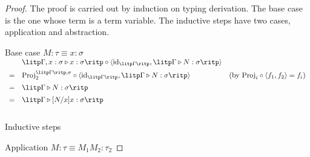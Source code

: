 \begin{proof}\mbox\\

The proof is carried out by induction on typing derivation. The base case is the one whose term is a term variable. The inductive steps have two cases, application and abstraction.

Base case $ M: \tau \equiv x: \sigma $ \\[5pt]
$
\begin{array}{rll}
   & \litp \Gamma , x: \sigma \triangleright x: \sigma \ritp \circ \langle \text{id}_{\litp \Gamma \ritp} , \litp \Gamma \triangleright N: \sigma \ritp \rangle & \\[5pt]
 = & \text{Proj}_2^{\litp \Gamma \ritp , \sigma} \circ \langle \text{id}_{\litp \Gamma \ritp} , \litp \Gamma \triangleright N: \sigma \ritp \rangle & (\text{by } \text{Proj}_i \circ \langle f_1, f_2 \rangle = f_i ) \\[5pt]
 = & \litp \Gamma \triangleright N: \sigma \ritp & \\[5pt]
 = & \litp \Gamma \triangleright [N/x]x: \sigma \ritp & \\[10pt]
\end{array}
$

Inductive steps

Application $ M: \tau \equiv M_1 M_2 : \tau_2 $


\end{proof}
